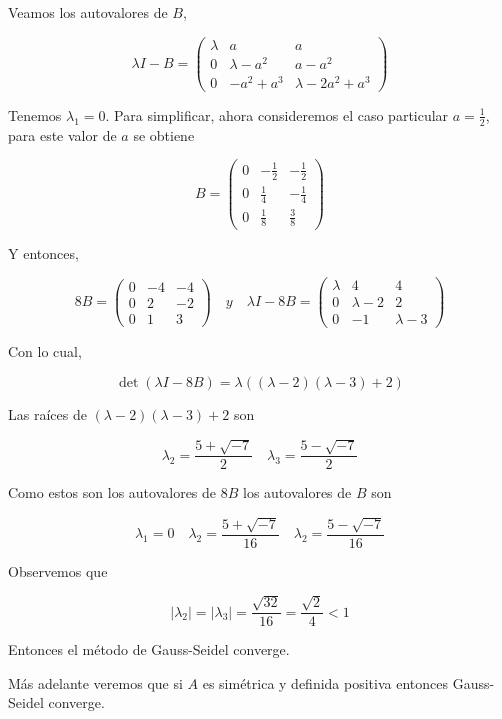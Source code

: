 \documentclass[10pt]{article}
\begin{document}
Veamos los autovalores de $B$,

$$
\lambda I-B=\left(\begin{array}{ccc}
\lambda & a & a \\
0 & \lambda-a^{2} & a-a^{2} \\
0 & -a^{2}+a^{3} & \lambda-2 a^{2}+a^{3}
\end{array}\right)
$$

Tenemos $\lambda_{1}=0$. Para simplificar, ahora consideremos el caso particular $a=\frac{1}{2}$, para este valor de $a$ se obtiene

$$
B=\left(\begin{array}{ccc}
0 & -\frac{1}{2} & -\frac{1}{2} \\
0 & \frac{1}{4} & -\frac{1}{4} \\
0 & \frac{1}{8} & \frac{3}{8}
\end{array}\right)
$$

Y entonces,

$$
8 B=\left(\begin{array}{ccc}
0 & -4 & -4 \\
0 & 2 & -2 \\
0 & 1 & 3
\end{array}\right) \quad y \quad \lambda I-8 B=\left(\begin{array}{ccc}
\lambda & 4 & 4 \\
0 & \lambda-2 & 2 \\
0 & -1 & \lambda-3
\end{array}\right)
$$

Con lo cual,

$$
\operatorname{det}(\lambda I-8 B)=\lambda((\lambda-2)(\lambda-3)+2)
$$

Las raíces de $(\lambda-2)(\lambda-3)+2$ son

$$
\lambda_{2}=\frac{5+\sqrt{-7}}{2} \quad \lambda_{3}=\frac{5-\sqrt{-7}}{2}
$$

Como estos son los autovalores de $8 B$ los autovalores de $B$ son

$$
\lambda_{1}=0 \quad \lambda_{2}=\frac{5+\sqrt{-7}}{16} \quad \lambda_{2}=\frac{5-\sqrt{-7}}{16}
$$

Observemos que

$$
\left|\lambda_{2}\right|=\left|\lambda_{3}\right|=\frac{\sqrt{32}}{16}=\frac{\sqrt{2}}{4}<1
$$

Entonces el método de Gauss-Seidel converge.

Más adelante veremos que si $A$ es simétrica y definida positiva entonces Gauss-Seidel converge.
\end{document}
